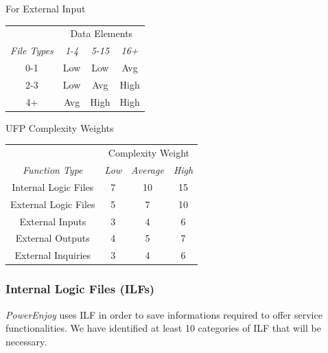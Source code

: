 \documentclass[english]{article}
\newenvironment{fptable}[2]{
	\begin{center}
	#1
	\begin{longtable}{|c|c|c|c|}
	\hline 
	&
	\multicolumn{3}{|c|}{{#2}}\\\nopagebreak\hline	
}{
	\hline\end{longtable}\end{center}
}
\newcommand{\fpvalues}[4]{%
	\textit{#1} & \textit{#2}& \textit{#3}& \textit{#4}\\\nopagebreak\hline
}
\newcommand{\powerenjoy}{\textit{PowerEnjoy }}
\begin{document}
\begin{fptable}{For External Input}{Data Elements}
\fpvalues{File Types}{1-4}{5-15}{16+}
0-1 & Low & Low & Avg\\
2-3 & Low & Avg & High\\
4+ & Avg & High & High\\
\end{fptable}

\begin{fptable}{UFP Complexity Weights}{Complexity Weight}
\fpvalues{Function Type}{Low}{Average}{High}
Internal Logic Files & 7 & 10 & 15\\
External Logic Files & 5 & 7 & 10\\
External Inputs & 3 & 4 & 6\\
External Outputs & 4 & 5 & 7\\
External Inquiries & 3 & 4 & 6\\
\end{fptable}

\subsubsection{Internal Logic Files (ILFs)}
\powerenjoy uses ILF in order to save informations required to offer service functionalities.
We have identified at least 10 categories of ILF that will be necessary.
\end{document}
